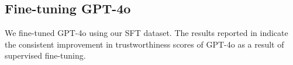 \documentclass{article} %
\begin{document}
\subsection{Fine-tuning GPT-4o}
We fine-tuned GPT-4o using our SFT dataset. The results reported in  indicate the consistent improvement in trustworthiness scores of GPT-4o as a result of supervised fine-tuning.

\begin{table}[htb!]
\caption{Performance of supervised fine-tuned GPT-4o.}
\label{tab:gpt-finetune}


\centering
{}
\end{table}
\end{document}
